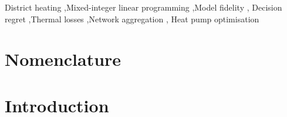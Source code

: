 \documentclass[a4paper,fleqn]{cas-sc}
\newif\ifmarkup \markupfalse          %
\newcommand{\new}[1]{\textcolor[HTML]{1A5FB4}{#1}}   %
\newcommand{\new}[1]{#1}
\begin{document}
\begin{keywords}
District heating \sep Mixed-integer linear programming \sep Model fidelity \sep
Decision regret \sep Thermal losses \sep Network aggregation \sep
Heat pump optimisation
\end{keywords}



\maketitle

\ifmarkup
\begin{center}\footnotesize\fbox{\parbox{0.9\linewidth}{%
\textbf{Marked-up copy.} \textcolor[HTML]{1A5FB4}{Blue} marks material new in this revision;
\textcolor[HTML]{0F7A5A}{green} marks text carried from the original submission and materially
rewritten; \textcolor[HTML]{9A9996}{grey} marks deletions we judged a reader would want flagged.
Unmarked text is unchanged. Because the manuscript was restructured and the model levels renamed,
marking is at paragraph rather than sentence granularity.}}
\end{center}
\fi


\section*{Nomenclature}
\new{}

\section{Introduction}
\label{sec:introduction}
\new{}
\end{document}
